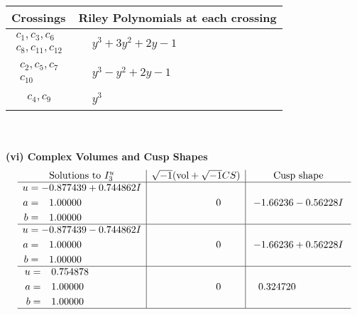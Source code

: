 \documentclass[1p]{elsarticle_modified}
\theoremstyle{definition}
\newcommand{\I}{\sqrt{-1}}
\begin{document}
\begin{tabular}{m{50pt}|m{274pt}}
Crossings & \hspace{64pt}Riley Polynomials at each crossing \\
\hline $$\begin{aligned}c_{1},c_{3},c_{6}\\c_{8},c_{11},c_{12}\end{aligned}$$&$\begin{aligned}
&y^3+3 y^2+2 y-1
\end{aligned}$\\
\hline $$\begin{aligned}c_{2},c_{5},c_{7}\\c_{10}\end{aligned}$$&$\begin{aligned}
&y^3- y^2+2 y-1
\end{aligned}$\\
\hline $$\begin{aligned}c_{4},c_{9}\end{aligned}$$&$\begin{aligned}
&y^3
\end{aligned}$\\
\hline
\end{tabular}\\~\\
\newpage\flushleft \textbf{(vi) Complex Volumes and Cusp Shapes}
$$\begin{array}{c|c|c}  
\text{Solutions to }I^u_{3}& \I (\text{vol} + \sqrt{-1}CS) & \text{Cusp shape}\\
 \hline 
\begin{aligned}
u &= -0.877439 + 0.744862 I \\
a &= \phantom{-}1.00000\phantom{ +0.000000I} \\
b &= \phantom{-}1.00000\phantom{ +0.000000I}\end{aligned}
 & \phantom{-0.000000 } 0 & -1.66236 - 0.56228 I \\ \hline\begin{aligned}
u &= -0.877439 - 0.744862 I \\
a &= \phantom{-}1.00000\phantom{ +0.000000I} \\
b &= \phantom{-}1.00000\phantom{ +0.000000I}\end{aligned}
 & \phantom{-0.000000 } 0 & -1.66236 + 0.56228 I \\ \hline\begin{aligned}
u &= \phantom{-}0.754878\phantom{ +0.000000I} \\
a &= \phantom{-}1.00000\phantom{ +0.000000I} \\
b &= \phantom{-}1.00000\phantom{ +0.000000I}\end{aligned}
 & \phantom{-0.000000 } 0 & \phantom{-}0.324720\phantom{ +0.000000I}\\
 \hline 
 \end{array}$$\newpage
\end{document}
